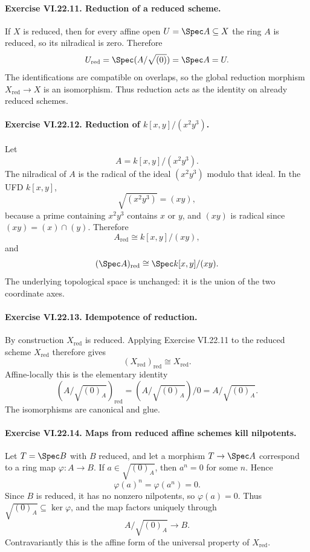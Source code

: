 \paragraph{Exercise VI.22.11. Reduction of a reduced scheme.}
\begin{solution}
If $X$ is reduced, then for every affine open $U=\Spec A\subseteq X$ the ring $A$ is
reduced, so its nilradical is zero.  Therefore
\[
 U_{\mathrm{red}}
 =\Spec(A/\sqrt{(0)})
 =\Spec A
 =U.
\]
The identifications are compatible on overlaps, so the global reduction morphism
$X_{\mathrm{red}}\to X$ is an isomorphism.  Thus reduction acts as the identity on already
reduced schemes.
\end{solution}

\paragraph{Exercise VI.22.12. Reduction of $k[x,y]/(x^2y^3)$.}
\begin{solution}
Let
\[
 A=k[x,y]/(x^2y^3).
\]
The nilradical of $A$ is the radical of the ideal $(x^2y^3)$ modulo that ideal.  In the UFD
$k[x,y]$,
\[
 \sqrt{(x^2y^3)}=(xy),
\]
because a prime containing $x^2y^3$ contains $x$ or $y$, and $(xy)$ is radical since
$(xy)=(x)\cap(y)$.  Therefore
\[
 A_{\mathrm{red}}
 \cong k[x,y]/(xy),
\]
and
\[
 (\Spec A)_{\mathrm{red}}
 \cong \Spec k[x,y]/(xy).
\]
The underlying topological space is unchanged: it is the union of the two coordinate axes.
\end{solution}

\paragraph{Exercise VI.22.13. Idempotence of reduction.}
\begin{solution}
By construction $X_{\mathrm{red}}$ is reduced.  Applying Exercise VI.22.11 to the reduced
scheme $X_{\mathrm{red}}$ therefore gives
\[
 (X_{\mathrm{red}})_{\mathrm{red}}\cong X_{\mathrm{red}}.
\]
Affine-locally this is the elementary identity
\[
 \left(A/\sqrt{(0)_A}\right)_{\mathrm{red}}
 =
 \left(A/\sqrt{(0)_A}\right)/0
 =
 A/\sqrt{(0)_A}.
\]
The isomorphisms are canonical and glue.
\end{solution}

\paragraph{Exercise VI.22.14. Maps from reduced affine schemes kill nilpotents.}
\begin{solution}
Let $T=\Spec B$ with $B$ reduced, and let a morphism
$T\to\Spec A$ correspond to a ring map $\varphi:A\to B$.  If $a\in\sqrt{(0)_A}$, then
$a^n=0$ for some $n$.  Hence
\[
 \varphi(a)^n=\varphi(a^n)=0.
\]
Since $B$ is reduced, it has no nonzero nilpotents, so $\varphi(a)=0$.  Thus
$\sqrt{(0)_A}\subseteq\ker\varphi$, and the map factors uniquely through
\[
 A/\sqrt{(0)_A}\longrightarrow B.
\]
Contravariantly this is the affine form of the universal property of $X_{\mathrm{red}}$.
\end{solution}

